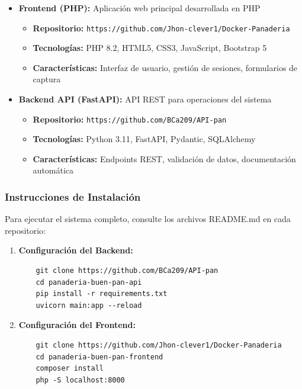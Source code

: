 \documentclass[conference]{IEEEtran}
\begin{document}
\begin{itemize}
    \item \textbf{Frontend (PHP):} Aplicación web principal desarrollada en PHP
    \begin{itemize}
        \item \textbf{Repositorio:} \texttt{https://github.com/Jhon-clever1/Docker-Panaderia}
        \item \textbf{Tecnologías:} PHP 8.2, HTML5, CSS3, JavaScript, Bootstrap 5
        \item \textbf{Características:} Interfaz de usuario, gestión de sesiones, formularios de captura
    \end{itemize}
    
    \item \textbf{Backend API (FastAPI):} API REST para operaciones del sistema
    \begin{itemize}
        \item \textbf{Repositorio:} \texttt{https://github.com/BCa209/API-pan}
        \item \textbf{Tecnologías:} Python 3.11, FastAPI, Pydantic, SQLAlchemy
        \item \textbf{Características:} Endpoints REST, validación de datos, documentación automática
    \end{itemize}
\end{itemize}

\subsubsection{Instrucciones de Instalación}
Para ejecutar el sistema completo, consulte los archivos README.md en cada repositorio:

\begin{enumerate}
    \item \textbf{Configuración del Backend:}
    \begin{verbatim}
    git clone https://github.com/BCa209/API-pan
    cd panaderia-buen-pan-api
    pip install -r requirements.txt
    uvicorn main:app --reload
    \end{verbatim}
    
    \item \textbf{Configuración del Frontend:}
    \begin{verbatim}
    git clone https://github.com/Jhon-clever1/Docker-Panaderia
    cd panaderia-buen-pan-frontend
    composer install
    php -S localhost:8000
    \end{verbatim}
\end{enumerate}
\end{document}
